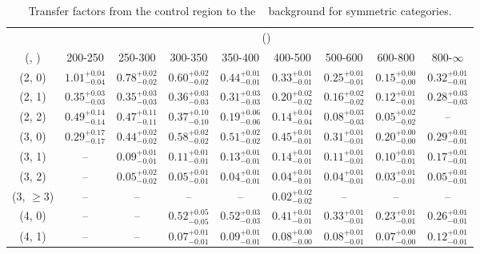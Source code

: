 \begin{table}[h!]
\tiny
\centering
\caption{Transfer factors from the \mj control region to the \zInv~ background for symmetric categories.\label{tab:tf_mu_zinv_sym}}
\begin{tabular}
{ccccccccc}
	\hline\hline
	& \multicolumn{8}{c}{\scalht (\gev)} \\ 
	 (\njet,  \nb) & 200-250 & 250-300 & 300-350 & 350-400 & 400-500 & 500-600 & 600-800 & 800-$\infty$ \\ [0.8ex] 
\hline
	(2, 0) & $1.01^{+ 0.04 }_{- 0.04 }$ & $0.78^{+ 0.02 }_{- 0.02 }$ & $0.60^{+ 0.02 }_{- 0.02 }$ & $0.44^{+ 0.01 }_{- 0.01 }$ & $0.33^{+ 0.01 }_{- 0.01 }$ & $0.25^{+ 0.01 }_{- 0.01 }$ & $0.15^{+ 0.00 }_{- 0.00 }$ & $0.32^{+ 0.01 }_{- 0.01 }$ \\[0.5ex] 
	(2, 1) & $0.35^{+ 0.03 }_{- 0.03 }$ & $0.35^{+ 0.03 }_{- 0.03 }$ & $0.36^{+ 0.03 }_{- 0.03 }$ & $0.31^{+ 0.03 }_{- 0.03 }$ & $0.20^{+ 0.02 }_{- 0.02 }$ & $0.16^{+ 0.02 }_{- 0.02 }$ & $0.12^{+ 0.01 }_{- 0.01 }$ & $0.28^{+ 0.03 }_{- 0.03 }$ \\[0.5ex] 
	(2, 2) & $0.49^{+ 0.14 }_{- 0.14 }$ & $0.47^{+ 0.11 }_{- 0.11 }$ & $0.37^{+ 0.10 }_{- 0.10 }$ & $0.19^{+ 0.06 }_{- 0.06 }$ & $0.14^{+ 0.04 }_{- 0.04 }$ & $0.08^{+ 0.03 }_{- 0.03 }$ & $0.05^{+ 0.02 }_{- 0.02 }$ & -- \\[0.5ex] 
	(3, 0) & $0.29^{+ 0.17 }_{- 0.17 }$ & $0.44^{+ 0.02 }_{- 0.02 }$ & $0.58^{+ 0.02 }_{- 0.02 }$ & $0.51^{+ 0.02 }_{- 0.02 }$ & $0.45^{+ 0.01 }_{- 0.01 }$ & $0.31^{+ 0.01 }_{- 0.01 }$ & $0.20^{+ 0.00 }_{- 0.00 }$ & $0.29^{+ 0.01 }_{- 0.01 }$ \\[0.5ex] 
	(3, 1) & -- & $0.09^{+ 0.01 }_{- 0.01 }$ & $0.11^{+ 0.01 }_{- 0.01 }$ & $0.13^{+ 0.01 }_{- 0.01 }$ & $0.14^{+ 0.01 }_{- 0.01 }$ & $0.11^{+ 0.01 }_{- 0.01 }$ & $0.10^{+ 0.01 }_{- 0.01 }$ & $0.17^{+ 0.01 }_{- 0.01 }$ \\[0.5ex] 
	(3, 2) & -- & $0.05^{+ 0.02 }_{- 0.02 }$ & $0.05^{+ 0.01 }_{- 0.01 }$ & $0.04^{+ 0.01 }_{- 0.01 }$ & $0.04^{+ 0.01 }_{- 0.01 }$ & $0.04^{+ 0.01 }_{- 0.01 }$ & $0.03^{+ 0.01 }_{- 0.01 }$ & $0.05^{+ 0.01 }_{- 0.01 }$ \\[0.5ex] 
	(3, $\ge3$) & -- & -- & -- & -- & $0.02^{+ 0.02 }_{- 0.02 }$ & -- & -- & -- \\[0.5ex] 
	(4, 0) & -- & -- & $0.52^{+ 0.05 }_{- 0.05 }$ & $0.52^{+ 0.03 }_{- 0.03 }$ & $0.41^{+ 0.01 }_{- 0.01 }$ & $0.33^{+ 0.01 }_{- 0.01 }$ & $0.23^{+ 0.01 }_{- 0.01 }$ & $0.26^{+ 0.01 }_{- 0.01 }$ \\[0.5ex] 
	(4, 1) & -- & -- & $0.07^{+ 0.01 }_{- 0.01 }$ & $0.09^{+ 0.01 }_{- 0.01 }$ & $0.08^{+ 0.00 }_{- 0.00 }$ & $0.08^{+ 0.01 }_{- 0.01 }$ & $0.07^{+ 0.00 }_{- 0.00 }$ & $0.12^{+ 0.01 }_{- 0.01 }$ \\[0.5ex] 

\end{tabular}
\end{table}
